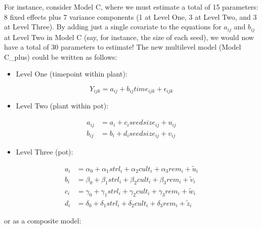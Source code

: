 \documentclass[
]{krantz}
\providecommand{\tightlist}{%
  \setlength{\itemsep}{0pt}\setlength{\parskip}{0pt}}
\begin{document}
For instance, consider Model C, where we must estimate a total of 15 parameters: 8 fixed effects plus 7 variance components (1 at Level One, 3 at Level Two, and 3 at Level Three). By adding just a single covariate to the equations for \(a_{ij}\) and \(b_{ij}\) at Level Two in Model C (say, for instance, the size of each seed), we would now have a total of 30 parameters to estimate! The new multilevel model (Model C\_plus) could be written as follows:

\begin{itemize}
\tightlist
\item
  Level One (timepoint within plant):
\end{itemize}

\begin{equation}
Y_{ijk} = a_{ij}+b_{ij}\textstyle{time}_{ijk}+\epsilon_{ijk}
\label{eq:lev1timemodcp}
\end{equation}

\begin{itemize}
\tightlist
\item
  Level Two (plant within pot):
\end{itemize}

\begin{align*}
a_{ij} & = a_{i}+c_{i}\textstyle{seedsize}_{ij}+u_{ij} \\
b_{ij} & = b_{i}+d_{i}\textstyle{seedsize}_{ij}+v_{ij}
\end{align*}

\begin{itemize}
\tightlist
\item
  Level Three (pot):
\end{itemize}

\begin{align*}
a_{i} & = \alpha_{0}+\alpha_{1}\textstyle{strl}_{i}+\alpha_{2}\textstyle{cult}_{i}+\alpha_{3}\textstyle{rem}_{i}+ \tilde{u}_{i}\\
b_{i} & = \beta_{0}+\beta_{1}\textstyle{strl}_{i}+\beta_{2}\textstyle{cult}_{i}+\beta_{3}\textstyle{rem}_{i}+ \tilde{v}_{i} \\
c_{i} & = \gamma_{0}+\gamma_{1}\textstyle{strl}_{i}+\gamma_{2}\textstyle{cult}_{i}+\gamma_{3}\textstyle{rem}_{i}+ \tilde{w}_{i} \\
d_{i} & = \delta_{0}+\delta_{1}\textstyle{strl}_{i}+\delta_{2}\textstyle{cult}_{i}+\delta_{3}\textstyle{rem}_{i}+ \tilde{z}_{i}
\end{align*}

or as a composite model:
\end{document}
